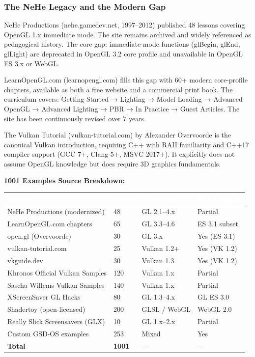 \documentclass[11pt,letterpaper]{article}
\newcommand{\tableheader}[1]{\textbf{\sffamily\textcolor{white}{#1}}}
\begin{document}
\subsubsection{The NeHe Legacy and the Modern Gap}

NeHe Productions (nehe.gamedev.net, 1997--2012) published 48 lessons covering OpenGL 1.x immediate mode. The site remains archived and widely referenced as pedagogical history. The core gap: immediate-mode functions (glBegin, glEnd, glLight) are deprecated in OpenGL 3.2 core profile and unavailable in OpenGL ES 3.x or WebGL.

LearnOpenGL.com (learnopengl.com) fills this gap with 60+ modern core-profile chapters, available as both a free website and a commercial print book. The curriculum covers: Getting Started → Lighting → Model Loading → Advanced OpenGL → Advanced Lighting → PBR → In Practice → Guest Articles. The site has been continuously revised over 7 years.

The Vulkan Tutorial (vulkan-tutorial.com) by Alexander Overvoorde is the canonical Vulkan introduction, requiring C++ with RAII familiarity and C++17 compiler support (GCC 7+, Clang 5+, MSVC 2017+). It explicitly does not assume OpenGL knowledge but does require 3D graphics fundamentals.

\textbf{1001 Examples Source Breakdown:}

\begin{center}
\begin{tabularx}{\textwidth}{L{4.5cm}C{1.8cm}XC{2cm}}
\toprule
{}
\tableheader{Source} & \tableheader{Count} & \tableheader{API Level} & \tableheader{Pi-5 Compat} \\
\midrule
NeHe Productions (modernized) & 48 & GL 2.1--4.x & Partial \\
LearnOpenGL.com chapters & 65 & GL 3.3--4.6 & ES 3.1 subset \\
open.gl (Overvoorde) & 30 & GL 3.x & Yes (ES 3.1) \\
vulkan-tutorial.com & 25 & Vulkan 1.2+ & Yes (VK 1.2) \\
vkguide.dev & 30 & Vulkan 1.3 & Yes (VK 1.2) \\
Khronos Official Vulkan Samples & 120 & Vulkan 1.x & Partial \\
Sascha Willems Vulkan Samples & 140 & Vulkan 1.x & Partial \\
XScreenSaver GL Hacks & 80 & GL 1.3--4.x & GL ES 3.0 \\
Shadertoy (open-licensed) & 200 & GLSL / WebGL & WebGL 2.0 \\
Really Slick Screensavers (GLX) & 10 & GL 1.x--2.x & Partial \\
Custom GSD-OS examples & 253 & Mixed & Yes \\
\textbf{Total} & \textbf{1001} & --- & --- \\
\bottomrule
\end{tabularx}
\end{center}
\end{document}
